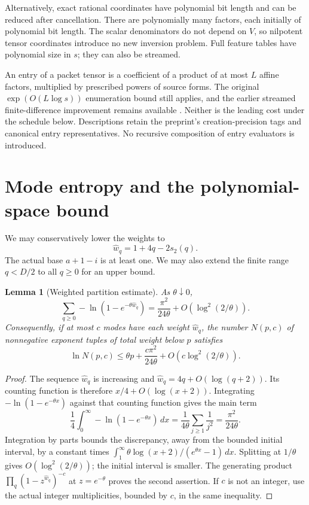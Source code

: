 \documentclass[11pt,letterpaper]{article}
\newtheorem{lemma}[theorem]{Lemma}
\theoremstyle{definition}\newtheorem{definition}[theorem]{Definition}
\theoremstyle{remark}\newtheorem{remark}[theorem]{Remark}
\begin{document}
Alternatively, exact rational coordinates have polynomial bit length and
can be reduced after cancellation. There are polynomially many factors,
each initially of polynomial bit length. The scalar denominators do not
depend on $V$, so nilpotent tensor coordinates introduce no new inversion
problem. Full feature tables have polynomial size in $s$; they can also be
streamed.

An entry of a packet tensor is a coefficient of a product of at most $L$
affine factors, multiplied by prescribed powers of source forms. The original
$\exp(O(L\log s))$ enumeration bound still applies, and the earlier
streamed finite-difference improvement remains available \cite{schedule}.
Neither is the leading cost under the schedule below. Descriptions retain
the preprint's creation-precision tags and canonical entry representatives.
No recursive composition of entry evaluators is introduced.

\section{Mode entropy and the polynomial-space bound}
\label{sec:entropy}

We may conservatively lower the weights to
\[
 \widehat w_q=1+4q-2s_2(q).
\]
The actual base $a+1-i$ is at least one. We may also extend the finite range
$q<D/2$ to all $q\ge0$ for an upper bound.

\begin{lemma}[Weighted partition estimate]\label{lem:entropy}
As $\theta\downarrow0$,
\[
 \sum_{q\ge0}-\ln(1-e^{-\theta\widehat w_q})
   =\frac{\pi^2}{24\theta}+O(\log^2(2/\theta)).
\]
Consequently, if at most $c$ modes have each weight $\widehat w_q$,
the number $N(p,c)$ of nonnegative exponent tuples of total weight below $p$
satisfies
\[
 \ln N(p,c)\le
 \theta p+\frac{c\pi^2}{24\theta}
       +O(c\log^2(2/\theta)).
\]
\end{lemma}
\begin{proof}
The sequence $\widehat w_q$ is increasing and
$\widehat w_q=4q+O(\log(q+2))$. Its counting function is therefore
$x/4+O(\log(x+2))$. Integrating
$-\ln(1-e^{-\theta x})$ against that counting function gives the main
term
\[
 \frac14\int_0^\infty-\ln(1-e^{-\theta x})\,dx
  =\frac1{4\theta}\sum_{j\ge1}\frac1{j^2}
  =\frac{\pi^2}{24\theta}.
\]
Integration by parts bounds the discrepancy, away from the bounded initial
interval, by a constant times
$\int_1^\infty\theta\log(x+2)/(e^{\theta x}-1)\,dx$.
Splitting at $1/\theta$ gives $O(\log^2(2/\theta))$; the initial
interval is smaller. The generating product
$\prod_q(1-z^{\widehat w_q})^{-c}$ at $z=e^{-\theta}$ proves the
second assertion. If $c$ is not an integer, use the actual integer
multiplicities, bounded by $c$, in the same inequality.
\end{proof}
\end{document}
